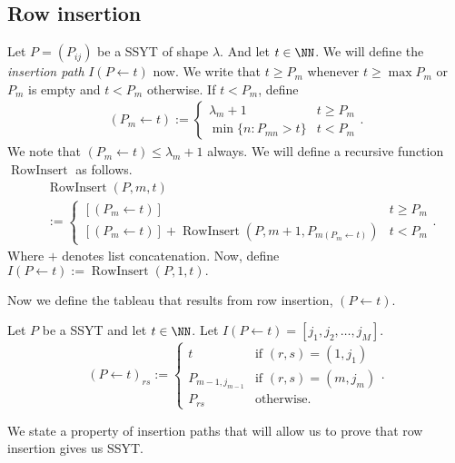 \documentclass{article}
\DeclareMathOperator{\RowInsert}{RowInsert}
\begin{document}
\subsection{Row insertion}

\begin{definition}
    Let $P = (P_{ij})$ be a SSYT of shape $\lambda$. And let $t \in \NN$. We will define the \textit{insertion path} $I(P\leftarrow t)$ now.
    We write that $t \geq P_m$ whenever $t \geq \max P_m$ or $P_m$ is empty and $t < P_m$ otherwise. 
    If $t < P_m$, define
    \begin{align*}
        (P_m \leftarrow t) := \begin{cases}
            \lambda_m + 1 & t \geq P_m \\
            \min\{n:P_{mn} > t\} & t < P_m 
        \end{cases}.
    \end{align*}
    We note that $(P_m \leftarrow t) \leq \lambda_m + 1$ always.
    We will define a recursive function $\RowInsert$ as follows.
    \begin{align*}
        &\RowInsert(P,m,t) \\
        &:= \begin{cases}
            [(P_m \leftarrow t)] & t \geq P_m \\
            [(P_m \leftarrow t)] + \RowInsert(P, m+1, P_{m(P_m \leftarrow t)}) & t < P_m
        \end{cases}.
    \end{align*}
    Where $+$ denotes list concatenation.
    Now, define $I(P\leftarrow t) := \RowInsert(P,1,t).$
\end{definition}

Now we define the tableau that results from row insertion, $(P \leftarrow t)$.

\begin{definition}
    Let $P$ be a SSYT and let $t \in \NN$. Let $I(P \leftarrow t) = [j_1, j_2, \ldots, j_M]$.
    \[
        (P \leftarrow t)_{rs} := \begin{cases}
            t & \text{if } (r,s) = (1, j_1) \\
            P_{m-1,j_{m-1}} & \text{if }(r,s) = (m, j_m) \\
            P_{rs} & \text{otherwise}.
        \end{cases}.
    \]
\end{definition}

We state a property of insertion paths that will allow us to prove that row insertion gives us SSYT.
\end{document}
